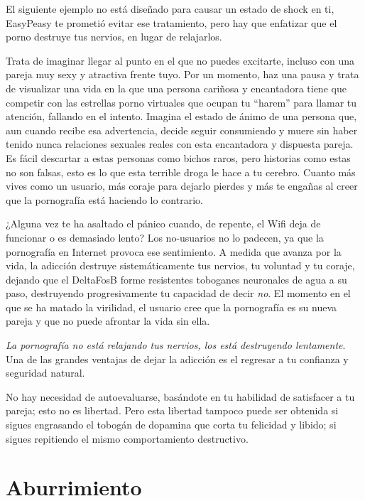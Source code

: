 \documentclass[
  spanish,
  openany]{book}
\begin{document}
El siguiente ejemplo no está diseñado para causar un estado de shock en ti, EasyPeasy te prometió evitar ese tratamiento, pero hay que enfatizar que el porno destruye tus nervios, en lugar de relajarlos.

Trata de imaginar llegar al punto en el que no puedes excitarte, incluso con una pareja muy sexy y atractiva frente tuyo. Por un momento, haz una pausa y trata de visualizar una vida en la que una persona cariñosa y encantadora tiene que competir con las estrellas porno virtuales que ocupan tu ``harem'' para llamar tu atención, fallando en el intento. Imagina el estado de ánimo de una persona que, aun cuando recibe esa advertencia, decide seguir consumiendo y muere sin haber tenido nunca relaciones sexuales reales con esta encantadora y dispuesta pareja. Es fácil descartar a estas personas como bichos raros, pero historias como estas no son falsas, esto es lo que esta terrible droga le hace a tu cerebro. Cuanto más vives como un usuario, más coraje para dejarlo pierdes y más te engañas al creer que la pornografía está haciendo lo contrario.

¿Alguna vez te ha asaltado el pánico cuando, de repente, el Wifi deja de funcionar o es demasiado lento? Los no-usuarios no lo padecen, ya que la pornografía en Internet provoca ese sentimiento. A medida que avanza por la vida, la adicción destruye sistemáticamente tus nervios, tu voluntad y tu coraje, dejando que el DeltaFosB forme resistentes toboganes neuronales de agua a su paso, destruyendo progresivamente tu capacidad de decir \emph{no}. El momento en el que se ha matado la virilidad, el usuario cree que la pornografía es su nueva pareja y que no puede afrontar la vida sin ella.

\emph{La pornografía no está relajando tus nervios, los está destruyendo lentamente}. Una de las grandes ventajas de dejar la adicción es el regresar a tu confianza y seguridad natural.

No hay necesidad de autoevaluarse, basándote en tu habilidad de satisfacer a tu pareja; esto no es libertad. Pero esta libertad tampoco puede ser obtenida si sigues engrasando el tobogán de dopamina que corta tu felicidad y libido; si sigues repitiendo el mismo comportamiento destructivo.

\hypertarget{aburrimiento}{%
\section{Aburrimiento}\label{aburrimiento}}
\end{document}
